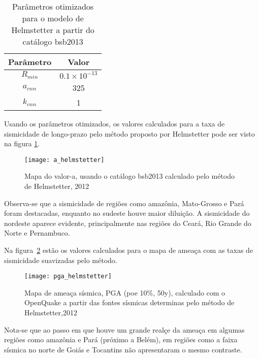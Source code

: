 \begin{table}[H]
	\centering
	\begin{tabular}{c|c}
		Parâmetro & Valor \\ \hline
		$R_{min}$ & $0.1\times10^{-13}$ \\
		$a_{cnn}$ & 325 \\
		$k_{cnn}$ & 1 \\
	\end{tabular}
	\caption{Parâmetros otimizados para o modelo de Helmstetter a partir do catálogo \gls{bsb2013}}
	\label{tab:hemlstetter}
\end{table}

Usando os parâmetros otimizados, os valores calculados para a taxa de sismicidade
de longo-prazo pelo método proposto por Helmstetter pode ser visto na figura \ref{fig:helm_r}.

\begin{figure}[H]
  \centering
  \texttt{[image: a\_helmstetter]} 
  \caption{Mapa do valor-a, usando o catálogo \gls{bsb2013} calculado pelo método de Helmstetter, 2012 }
  \label{fig:helm_r} 
\end{figure}

Observa-se que a sismicidade de regiões como amazônia, Mato-Grosso e Pará foram destacadas,
enquanto no sudeste houve maior diluição. A sismicidade do nordeste aparece evidente, principalmente
nas regiões do Ceará, Rio Grande do Norte e Pernambuco.

Na figura~\ref{fig:helm_h} estão os valores calculados para o mapa de ameaça 
com as taxas de sismicidade suavizadas pelo método.

\begin{figure}[H]
  \centering
  \texttt{[image: pga\_helmstetter]} 
  \caption{Mapa de ameaça sísmica, PGA (poe 10\%, 50y), 
  		   calculado com o OpenQuake a partir das fontes sísmicas
  		   determinas pelo método de Helmstetter,2012 }
  \label{fig:helm_h} 
\end{figure}

Nota-se que ao passo em que houve um grande realçe da ameaça em algumas regiões como amazônia e Pará (próximo a Belém),
em regiões como a faixa sísmica no norte de Goiás e Tocantins não apresentaram o mesmo contraste.


